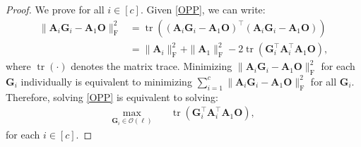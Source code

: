 \documentclass[final,3p,times]{elsarticle}
\theoremstyle{plain}
\newcommand{\matr}[1]{\bm{#1}}        %
\newcommand{\tr}{\operatorname{tr}}
\begin{document}
\begin{proof}
We prove for all \(i \in [c]\). Given \eqref{OPP}, we can write:
\begin{align*}
    \| \matr{A}_i \matr{G}_i - \matr{A}_1 \matr{O} \|_\mathrm{F}^2 
    &= \tr\left((\matr{A}_i \matr{G}_i - \matr{A}_1 \matr{O})^\top (\matr{A}_i \matr{G}_i - \matr{A}_1 \matr{O})\right) \\
    &= \| \matr{A}_i \|_\mathrm{F}^2 + \| \matr{A}_1 \|_\mathrm{F}^2 - 2\tr(\matr{G}_i^\top \matr{A}_i^\top \matr{A}_1 \matr{O}),
\end{align*}
where \(\tr(\cdot)\) denotes the matrix trace. Minimizing \(\| \matr{A}_i \matr{G}_i - \matr{A}_1 \matr{O} \|_\mathrm{F}^2\) for each \(\matr{G}_i\) individually is equivalent to minimizing \(\sum_{i=1}^c \| \matr{A}_i \matr{G}_i - \matr{A}_1 \matr{O} \|_\mathrm{F}^2\) for all \(\matr{G}_i\). Therefore, solving \eqref{OPP} is equivalent to solving:
\begin{equation}
\label{eq: GOPP_trace}
\begin{aligned}
\max_{\matr{G}_i \in \mathcal{O}(\ell)} \quad & \tr(\matr{G}_i^\top \matr{A}_i^\top \matr{A}_1 \matr{O}),
\end{aligned}
\end{equation}
for each \(i \in [c]\). 


\end{proof}
\end{document}
